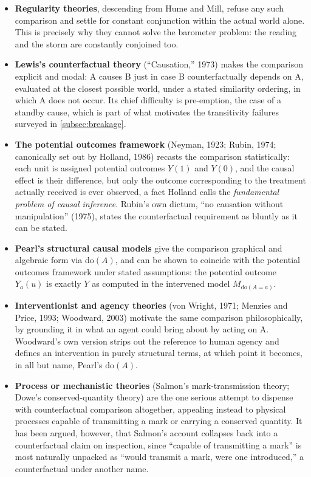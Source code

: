 \documentclass[11pt]{article}
\theoremstyle{definition}
\begin{document}
\begin{itemize}[leftmargin=1.4em,itemsep=0.35em]
  \item \textbf{Regularity theories}, descending from Hume and Mill, refuse any such comparison and settle for constant conjunction within the actual world alone. This is precisely why they cannot solve the barometer problem: the reading and the storm are constantly conjoined too.
  \item \textbf{Lewis's counterfactual theory} (``Causation,'' 1973) makes the comparison explicit and modal: A causes B just in case B counterfactually depends on A, evaluated at the closest possible world, under a stated similarity ordering, in which A does not occur. Its chief difficulty is pre-emption, the case of a standby cause, which is part of what motivates the transitivity failures surveyed in \cref{subsec:breakage}.
  \item \textbf{The potential outcomes framework} (Neyman, 1923; Rubin, 1974; canonically set out by Holland, 1986) recasts the comparison statistically: each unit is assigned potential outcomes $Y(1)$ and $Y(0)$, and the causal effect is their difference, but only the outcome corresponding to the treatment actually received is ever observed, a fact Holland calls the \emph{fundamental problem of causal inference}. Rubin's own dictum, ``no causation without manipulation'' (1975), states the counterfactual requirement as bluntly as it can be stated.
  \item \textbf{Pearl's structural causal models} give the comparison graphical and algebraic form via $\mathrm{do}(A)$, and can be shown to coincide with the potential outcomes framework under stated assumptions: the potential outcome $Y_a(u)$ is exactly $Y$ as computed in the intervened model $M_{\mathrm{do}(A=a)}$.
  \item \textbf{Interventionist and agency theories} (von Wright, 1971; Menzies and Price, 1993; Woodward, 2003) motivate the same comparison philosophically, by grounding it in what an agent could bring about by acting on A. Woodward's own version strips out the reference to human agency and defines an intervention in purely structural terms, at which point it becomes, in all but name, Pearl's $\mathrm{do}(A)$.
  \item \textbf{Process or mechanistic theories} (Salmon's mark-transmission theory; Dowe's conserved-quantity theory) are the one serious attempt to dispense with counterfactual comparison altogether, appealing instead to physical processes capable of transmitting a mark or carrying a conserved quantity. It has been argued, however, that Salmon's account collapses back into a counterfactual claim on inspection, since ``capable of transmitting a mark'' is most naturally unpacked as ``would transmit a mark, were one introduced,'' a counterfactual under another name.
\end{itemize}
\end{document}
